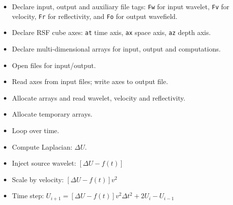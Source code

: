 \tiny

\normalsize

\begin{itemize}
\item Declare input, output and auxiliary file tags:
\texttt{Fw} for input wavelet, 
\texttt{Fv} for velocity,
\texttt{Fr} for reflectivity, and
\texttt{Fo} for output wavefield.
\tiny

\normalsize

\item Declare RSF cube axes:
\texttt{at} time axis,
\texttt{ax} space axis,
\texttt{az} depth axis.
\tiny

\normalsize

\item Declare multi-dimensional arrays for input, output and computations.
\tiny

\normalsize

\item Open files for input/output.
\tiny

\normalsize

\item Read axes from input files; write axes to output file.
\tiny

\normalsize

\item Allocate arrays and read wavelet, velocity and reflectivity.
\tiny

\normalsize

\item Allocate temporary arrays.
\tiny

\normalsize

\item Loop over time.
\tiny

\normalsize

\item Compute Laplacian: $\Delta U$.
\tiny

\normalsize

\item Inject source wavelet: $\left[ \Delta U - f(t) \right]$
\tiny

\normalsize

\item Scale by velocity: $\left[ \Delta U - f(t) \right] v^2$
\tiny

\normalsize

\item Time step: 
$U_{i+1} = \left[ \Delta U -f(t) \right] v^2 \Delta t^2 + 2 U_{i} - U_{i-1}$
\tiny

\normalsize

\end{itemize}

